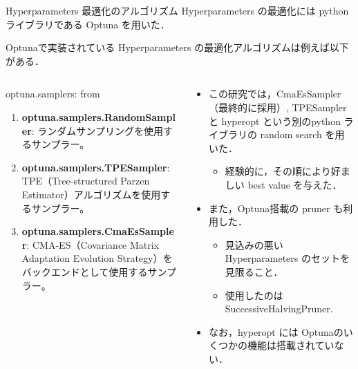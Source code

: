 \begin{frame}{Hyperparameters 最適化のアルゴリズム}
    Hyperparameters の最適化には python ライブラリである Optuna を用いた．
     
    Optunaで実装されている Hyperparameters の最適化アルゴリズムは例えば以下がある．
    \begin{columns}[T] %
        \begin{column}{.5\textwidth}
            

            \begin{block}{optuna.samplers: from \cite{optuna_doc}}
                \begin{enumerate}
                    \item \textbf{optuna.samplers.RandomSampler}: ランダムサンプリングを使用するサンプラー。
                    \item \textbf{optuna.samplers.TPESampler}: TPE（Tree-structured Parzen Estimator）アルゴリズムを使用するサンプラー。
                    \item \textbf{optuna.samplers.CmaEsSampler}: CMA-ES（Covariance Matrix Adaptation Evolution Strategy）をバックエンドとして使用するサンプラー。
                \end{enumerate}
                
            \end{block}
        
        \end{column}
        \begin{column}{.5\textwidth}
            \begin{itemize}
                \item この研究では，CmaEsSampler （最終的に採用）, TPESampler と hyperopt という別のpython ライブラリの random search を用いた．\begin{itemize}
                    \item 経験的に，その順により好ましい best value を与えた．
                    
                \end{itemize}
                \item また，Optuna搭載の pruner も利用した．\begin{itemize}
                    \item 見込みの悪い Hyperparameters のセットを見限ること．
                    \item 使用したのは SuccessiveHalvingPruner.
                \end{itemize}
                \item なお，hyperopt には Optunaのいくつかの機能は搭載されていない．
            \end{itemize}
        \end{column}
      \end{columns}


\end{frame}



